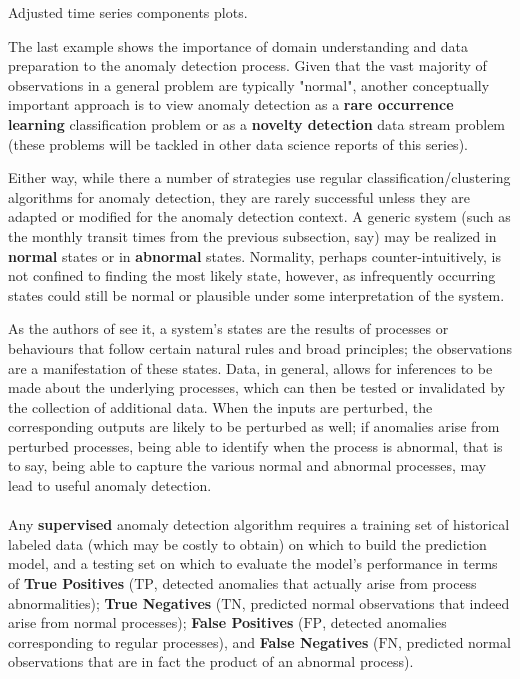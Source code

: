 \documentclass[20pt,landscape,footrule,headrule]{foils}
\def\fh{\foilhead}
\begin{document}
\begin{center}
\begin{center}
Adjusted time series components plots.
\end{center} 
The last example shows the importance of domain understanding and data preparation to the anomaly detection process. Given that the vast majority of observations in a general problem are typically "normal", another conceptually important approach is to view anomaly detection as a \textbf{rare occurrence learning} classification problem or as a \textbf{novelty detection} data stream problem (these problems will be tackled in other data science reports of this series). \par Either way, while there a number of strategies use regular classification/clustering algorithms for anomaly detection, they are rarely successful unless they are adapted or modified for the anomaly detection context.  
\fh{Basic Concepts}
A generic system (such as the monthly transit times from the previous subsection, say) may be realized in \textbf{normal} states or in \textbf{abnormal} states. Normality, perhaps counter-intuitively, is not confined to finding the most likely state, however, as infrequently occurring states could still be normal or plausible under some interpretation of the system. \par As the authors of \cite{A10} see it, a system's states are the results of processes or behaviours that follow certain natural rules and broad principles; the observations are a manifestation of these states. Data, in general, allows for inferences to be made about the underlying processes, which can then be tested or invalidated by the collection of additional data. When the inputs are perturbed, the corresponding outputs are likely to be perturbed as well; if anomalies arise from perturbed processes, being able to identify when the process is abnormal, that is to say, being able to capture the various normal and abnormal processes, may lead to useful anomaly detection. 
 \ \\ \ \\ Any \textbf{supervised} anomaly detection algorithm requires a training set of historical labeled data (which may be costly to obtain) on which to build the prediction model, and a testing set on which to evaluate the model's performance in terms of \textbf{True Positives} ($\text{TP}$, detected anomalies that actually arise from process abnormalities); 
\textbf{True Negatives} ($\text{TN}$, predicted normal observations that indeed arise from normal processes); \textbf{False Positives} ($\text{FP}$, detected anomalies corresponding to regular processes), and \textbf{False Negatives} ($\text{FN}$, predicted normal observations that are in fact the product of an abnormal process). \newpage\noindent

\end{center}
\end{document}
